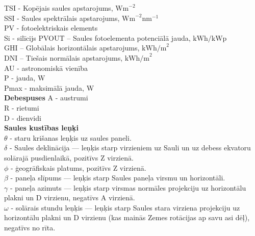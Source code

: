 \noindent TSI - Kopējais saules apstarojums, $\textrm{Wm}^{-2}$\\
SSI - Saules spektrālais apstarojums, $\textrm{Wm}^{-2}\textrm{nm}^{-1}$\\
PV - fotoelektriskais elements\\ %
Si - silīcijs
PVOUT – Saules fotoelementa potenciālā jauda, $\textrm{kWh/kWp}$\\ %
GHI – Globālais horizontālais apstarojums,  $\textrm{kWh/m}^2$\\ %
DNI – Tiešais normālais apstarojums, $\textrm{kWh/m}^2$\\ %
AU - astronomiskā vienība\\  %
P - jauda, 	W\\
Pmax - maksimālā jauda, W\\
\textbf{Debespuses}
A - austrumi\\
R - rietumi\\
D - dienvidi\\
\textbf{Saules kustības leņķi}\\
$\theta$ - staru krišanas leņķis uz saules paneli.\\
$\delta$ - Saules deklinācija --- leņķis starp virzieniem uz Sauli un uz debess ekvatoru solārajā pusdienlaikā, pozitīvs Z virzienā.\\
 $\phi$  - ģeogrāfiskais platums, pozitīvs Z virzienā.\\
$\beta$  - paneļa slīpums --- leņķis starp Saules paneļa virsmu un horizontāli.\\
$\gamma$ - paneļa azimuts --- leņķis starp virsmas normāles projekciju uz horizontālu  plakni un D virzienu, negatīvs A virzienā.\\
$\omega$ - solārais stundu leņķis --- leņķis starp Saules stara virziena projekciju uz horizontālu plakni un D virzienu (kas mainās Zemes rotācijas ap  savu asi dēļ), negatīvs no rīta.